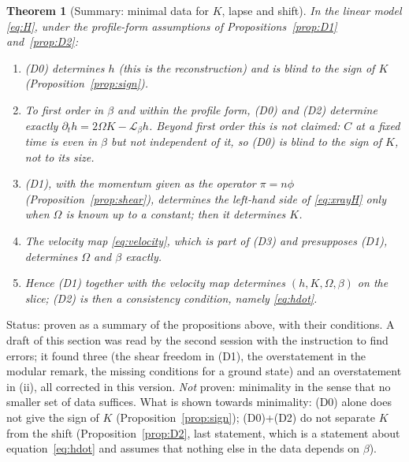 \documentclass[11pt,a4paper]{article}
\theoremstyle{stmt}
\newtheorem{theorem}{Theorem}[section]
\theoremstyle{defn}
\theoremstyle{rmk}
\numberwithin{equation}{section}
\newcommand{\Lie}{\mathcal{L}}
\newcommand{\status}[1]{\par\noindent\textsf{\small Status: #1}\par}
\begin{document}
{\begin{theorem}[Summary: minimal data for $K$, lapse and shift]\label{thm:summary}
In the linear model \eqref{eq:H}, under the profile-form assumptions of Propositions~\ref{prop:D1} and~\ref{prop:D2}:
\begin{enumerate}[label=\textup{(\roman*)}]
\item \textup{(D0)} determines $h$ (this is the reconstruction) and is blind to the sign of $K$ (Proposition~\ref{prop:sign}).
\item To first order in $\beta$ and within the profile form, \textup{(D0)} and \textup{(D2)} determine exactly $\partial_th=2\Omega K-\Lie_\beta h$. Beyond first order this is not claimed: $C$ at a fixed time is even in $\beta$ but not independent of it, so \textup{(D0)} is blind to the sign of $K$, not to its size.
\item \textup{(D1)}, with the momentum given as the operator $\pi=n\phi$ (Proposition~\ref{prop:shear}), determines the left-hand side of \eqref{eq:xrayH} only when $\Omega$ is known up to a constant; then it determines $K$.
\item The velocity map \eqref{eq:velocity}, which is part of \textup{(D3)} and presupposes \textup{(D1)}, determines $\Omega$ and $\beta$ exactly.
\item Hence \textup{(D1)} together with the velocity map determines $(h,K,\Omega,\beta)$ on the slice; \textup{(D2)} is then a consistency condition, namely \eqref{eq:hdot}.
\end{enumerate}
\end{theorem}
\status{proven as a summary of the propositions above, with their conditions. A draft of this section was read by the second session with the instruction to find errors; it found three (the shear freedom in (D1), the overstatement in the modular remark, the missing conditions for a ground state) and an overstatement in (ii), all corrected in this version. \emph{Not} proven: minimality in the sense that no smaller set of data suffices. What is shown towards minimality: (D0) alone does not give the sign of $K$ (Proposition~\ref{prop:sign}); (D0)+(D2) do not separate $K$ from the shift (Proposition~\ref{prop:D2}, last statement, which is a statement about equation~\eqref{eq:hdot} and assumes that nothing else in the data depends on $\beta$).}

}
\end{document}
